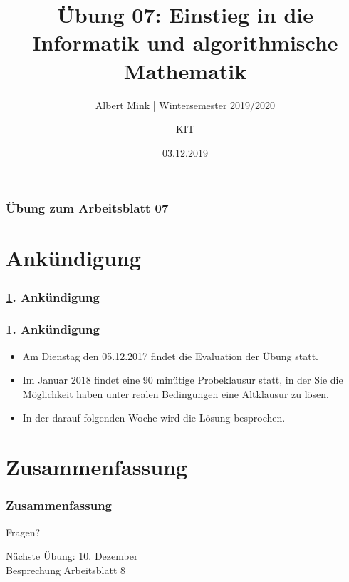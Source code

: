 \documentclass[c,18pt]{beamer}
\date{03.12.2019}
\title{Übung 07: Einstieg in die Informatik und algorithmische Mathematik}
\subtitle{Albert Mink | Wintersemester 2019/2020}
\author[Albert Mink, ]{KIT}
\institute[Institut für Angewandte und Numerische Mathematik (IANM)]{Institut für Angewandte und Numerische Mathematik}
\begin{document}
\begin{frame}
  \maketitle
\end{frame}

\begin{frame}
  \frametitle{Übung zum Arbeitsblatt 07}%
\tableofcontents[hideallsubsections]
\end{frame}

\def\kap{0}
\section{Ank\"undigung}\label{K:ank}
\begin{frame}
  \frametitle{\ref{K:ank}. Ank\"undigung}%
\tableofcontents[current]
\end{frame}

\begin{frame}
  \frametitle{\ref{K:ank}. Ank\"undigung}%

\begin{itemize}
\item Am Dienstag den 05.12.2017 findet die Evaluation der \"Ubung statt.
\item Im Januar 2018 findet eine 90 min\"utige Probeklausur statt, in der Sie die M\"oglichkeit haben unter realen Bedingungen eine Altklausur zu l\"osen.
\item In der darauf folgenden Woche wird die L\"osung besprochen.
\end{itemize}

\end{frame}


\def\kap{2}
\setcounter{exercise}{23}
\setcounter{exercise}{24}
\setcounter{exercise}{25}
\setcounter{exercise}{26}

\section{Zusammenfassung}
\begin{frame}
  \frametitle{Zusammenfassung}%
\tableofcontents[hideallsubsections]
\end{frame}

\begin{frame}
\centering
\Huge\textcolor{KITgreen}{Fragen?}
\vspace{2cm}

{\LARGE
N\"achste \"Ubung: 10. Dezember\\
Besprechung Arbeitsblatt 8
}
\end{frame}


\end{document}
